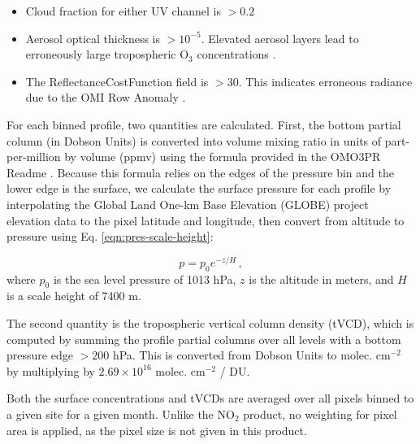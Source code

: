 \documentclass[a4paper,10pt,oneside]{article}
\newcommand{\ce}[1]{$\mathrm{#1}$}
\begin{document}
\begin{sloppy}
	\begin{itemize}
	\item Cloud fraction for either UV channel is $> 0.2$
	\item Aerosol optical thickness is $> 10^{-5}$. Elevated aerosol layers lead to erroneously large tropospheric \ce{O_3} concentrations \cite{omo3pr-readme}.
	\item The ReflectanceCostFunction field is $> 30$. This indicates erroneous radiance due to the OMI Row Anomaly \cite{row-anomaly}.
	\end{itemize}
	
	For each binned profile, two quantities are calculated. First, the bottom partial column (in Dobson Units) is converted into volume mixing ratio in units of part-per-million by volume (ppmv) using the formula provided in the OMO3PR Readme \cite{omo3pr-readme}. Because this formula relies on the edges of the pressure bin and the lower edge is the surface, we calculate the surface pressure for each profile by interpolating the Global Land One-km Base Elevation (GLOBE) project elevation data \cite{globe} to the pixel latitude and longitude, then convert from altitude to pressure using Eq. \eqref{eqn:pres-scale-height}:
	
	\begin{equation}
	\label{eqn:pres-scale-height}
	p = p_0 e^{-z/H} \,,
	\end{equation}
	where $p_0$ is the sea level pressure of 1013 hPa, $z$ is the altitude in meters, and $H$ is a scale height of 7400 m.
	
	The second quantity is the tropospheric vertical column density (tVCD), which is computed by summing the profile partial columns over all levels with a bottom pressure edge $> 200$ hPa. This is converted from Dobson Units to molec. cm$^{-2}$ by multiplying by $2.69 \times 10^{16}$
molec. cm$^{-2}$ / DU. 

	Both the surface concentrations and tVCDs are averaged over all pixels binned to a given site for a given month. Unlike the \ce{NO_2} product, no weighting for pixel area is applied, as the pixel size is not given in this product.
	 

\end{sloppy}
\end{document}
